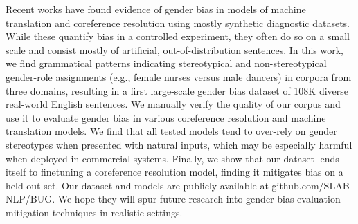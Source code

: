 Recent works have found evidence of gender bias in models of machine translation and coreference resolution using mostly synthetic diagnostic datasets. While these quantify bias in a controlled experiment, they often do so on a small scale and consist mostly of artificial, out-of-distribution sentences. In this work, we find grammatical patterns indicating stereotypical and non-stereotypical gender-role assignments (e.g., female nurses versus male dancers) in corpora from three domains, resulting in a first large-scale gender bias dataset of 108K diverse real-world English sentences. We manually verify the quality of our corpus and use it to evaluate gender bias in various coreference resolution and machine translation models. We find that all tested models tend to over-rely on gender stereotypes when presented with natural inputs, which may be especially harmful when deployed in commercial systems. Finally, we show that our dataset lends itself to finetuning a coreference resolution model, finding it mitigates bias on a held out set. Our dataset and models are publicly available at github.com/SLAB-NLP/BUG. We hope they will spur future research into gender bias evaluation mitigation techniques in realistic settings.
